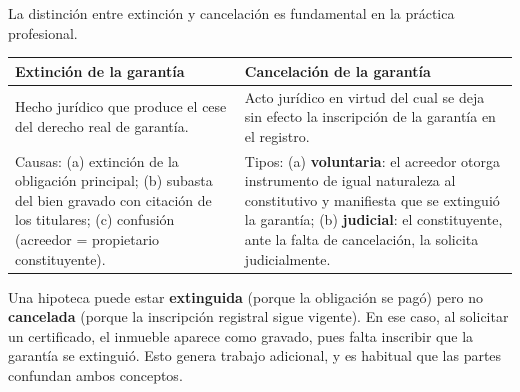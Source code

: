 \documentclass[12pt,oneside]{book}
\begin{document}
La distinción entre extinción y cancelación es fundamental en la práctica profesional.

\begin{table}[H]
\centering
\begin{tabularx}{\textwidth}{@{}LL@{}}
\toprule
\textbf{Extinción de la garantía} & \textbf{Cancelación de la garantía} \\
\midrule
Hecho jurídico que produce el cese del derecho real de garantía. & Acto jurídico en virtud del cual se deja sin efecto la inscripción de la garantía en el registro. \\
\addlinespace
Causas: (a) extinción de la obligación principal; (b) subasta del bien gravado con citación de los titulares; (c) confusión (acreedor = propietario constituyente). & Tipos: (a) \textbf{voluntaria}: el acreedor otorga instrumento de igual naturaleza al constitutivo y manifiesta que se extinguió la garantía; (b) \textbf{judicial}: el constituyente, ante la falta de cancelación, la solicita judicialmente. \\
\bottomrule
\end{tabularx}
\end{table}

\begin{important}
Una hipoteca puede estar \textbf{extinguida} (porque la obligación se pagó) pero no \textbf{cancelada} (porque la inscripción registral sigue vigente). En ese caso, al solicitar un certificado, el inmueble aparece como gravado, pues falta inscribir que la garantía se extinguió. Esto genera trabajo adicional, y es habitual que las partes confundan ambos conceptos.
\end{important}
\end{document}
